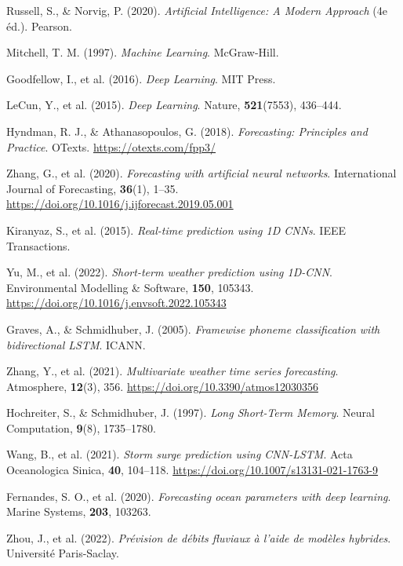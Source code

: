 \documentclass[a4paper,12pt,openany]{report}
\begin{document}
\begin{thebibliography}{99}
	Russell, S., \& Norvig, P. (2020).
	\textit{Artificial Intelligence: A Modern Approach} (4e éd.).
	Pearson.
	
	Mitchell, T. M. (1997).
	\textit{Machine Learning}.
	McGraw-Hill.
	
	Goodfellow, I., et al. (2016).
	\textit{Deep Learning}.
	MIT Press.
	
	LeCun, Y., et al. (2015).
	\textit{Deep Learning}.
	Nature, \textbf{521}(7553), 436–444.
	
	Hyndman, R. J., \& Athanasopoulos, G. (2018).
	\textit{Forecasting: Principles and Practice}.
	OTexts. \url{https://otexts.com/fpp3/}
	
	Zhang, G., et al. (2020).
	\textit{Forecasting with artificial neural networks}.
	International Journal of Forecasting, \textbf{36}(1), 1–35. \url{https://doi.org/10.1016/j.ijforecast.2019.05.001}
	
	Kiranyaz, S., et al. (2015).
	\textit{Real-time prediction using 1D CNNs}.
	IEEE Transactions.
	
	Yu, M., et al. (2022).
	\textit{Short-term weather prediction using 1D-CNN}.
	Environmental Modelling \& Software, \textbf{150}, 105343. \url{https://doi.org/10.1016/j.envsoft.2022.105343}
	
	Graves, A., \& Schmidhuber, J. (2005).
	\textit{Framewise phoneme classification with bidirectional LSTM}.
	ICANN.
	
	Zhang, Y., et al. (2021).
	\textit{Multivariate weather time series forecasting}.
	Atmosphere, \textbf{12}(3), 356. \url{https://doi.org/10.3390/atmos12030356}
	
	Hochreiter, S., \& Schmidhuber, J. (1997).
	\textit{Long Short-Term Memory}.
	Neural Computation, \textbf{9}(8), 1735–1780.
	
	Wang, B., et al. (2021).
	\textit{Storm surge prediction using CNN-LSTM}.
	Acta Oceanologica Sinica, \textbf{40}, 104–118. \url{https://doi.org/10.1007/s13131-021-1763-9}
	
	Fernandes, S. O., et al. (2020).
	\textit{Forecasting ocean parameters with deep learning}.
	Marine Systems, \textbf{203}, 103263.
	
	Zhou, J., et al. (2022).
	\textit{Prévision de débits fluviaux à l'aide de modèles hybrides}.
	Université Paris-Saclay.
	

\end{thebibliography}
\end{document}
